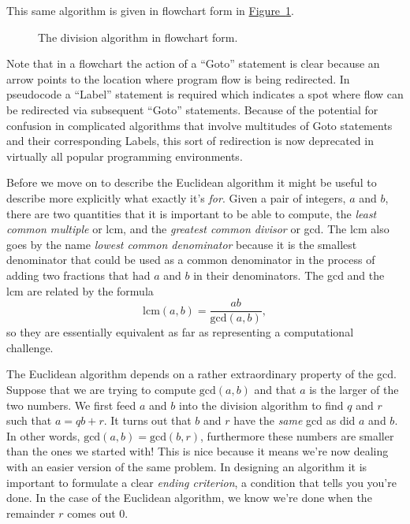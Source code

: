 \documentclass[10pt,]{book}
\theoremstyle{plain}
\theoremstyle{definition}
\theoremstyle{definition}
\numberwithin{equation}{section}
\newcommand{\lcm}[2]{\mbox{lcm} (#1, #2)}
\renewcommand{\gcd}[2]{\mbox{gcd} (#1, #2)}
\begin{document}
    This same algorithm is given in flowchart form in
    \hyperref[fig_div_alg]{Figure~\ref{fig_div_alg}}.
\leavevmode%
\begin{figure}
\centering
{

}
\caption{The division algorithm in flowchart form.\label{fig_div_alg}}
\end{figure}
\par

    Note that in a flowchart the action of a ``Goto'' statement is clear
    because an arrow points to the location where program flow is being
    redirected. In pseudocode a ``Label'' statement is required which
    indicates a spot where flow can be redirected via subsequent ``Goto''
    statements. Because of the potential for confusion in complicated
    algorithms that involve multitudes of Goto statements and their
    corresponding Labels, this sort of redirection is now deprecated in
    virtually all popular programming environments.
\par

    Before we move on to describe the Euclidean algorithm it might be
    useful to describe more explicitly what exactly it's \emph{for}.
    Given a pair of integers, \(a\) and \(b\), there are two quantities that
    it is important to be able to compute, the 
    \emph{least common multiple}
    or lcm, and the 
    \emph{greatest common divisor} or gcd. The lcm also
    goes by the name \emph{lowest common denominator} because it is the
    smallest denominator that could be used as a common denominator in the
    process of adding two fractions that had \(a\) and \(b\) in their
    denominators. The gcd and the lcm are related by the formula
    \begin{equation*}
      \lcm{a}{b} = \frac{ab}{\gcd{a}{b}},
    \end{equation*}
    so they are essentially equivalent as far as representing a
    computational challenge.
\par

    The  Euclidean algorithm depends
    on a rather extraordinary property of
    the gcd. Suppose that we are trying to compute \(\gcd{a}{b}\) and that
    \(a\) is the larger of the two numbers. We first feed \(a\) and \(b\) into
    the division algorithm to find \(q\) and \(r\) such that \(a = qb +r\). It
    turns out that \(b\) and \(r\) have the \emph{same} gcd as did \(a\) and
    \(b\). In other words, \(\gcd{a}{b} = \gcd{b}{r}\), furthermore these
    numbers are smaller than the ones we started with! This is nice
    because it means we're now dealing with an easier version of the same
    problem. In designing an algorithm it is important to formulate a
    clear \emph{ending criterion}, a condition that tells you you're done.
    In the case of the Euclidean algorithm, we know we're done when the
    remainder \(r\) comes out \(0\).
\par
\end{document}
